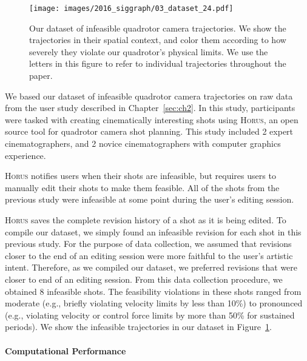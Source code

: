 \begin{figure}[th!]
\centering
\texttt{[image: images/2016\_siggraph/03\_dataset\_24.pdf]}
\caption{
Our dataset of infeasible quadrotor camera trajectories.
We show the trajectories in their spatial context, and color them according to how severely they violate our quadrotor's physical limits.
We use the letters in this figure to refer to individual trajectories throughout the paper.
}
\label{fig:ch3:dataset}
\end{figure}

We based our dataset of infeasible quadrotor camera trajectories on raw data from the user study described in Chapter~\ref{sec:ch2}.
In this study, participants were tasked with creating cinematically interesting shots using \textsc{Horus}, an open source tool for quadrotor camera shot planning.
This study included 2 expert cinematographers, and 2 novice cinematographers with computer graphics experience.

\textsc{Horus} notifies users when their shots are infeasible, but requires users to manually edit their shots to make them feasible.
All of the shots from the previous study were infeasible at some point during the user's editing session.

\textsc{Horus} saves the complete revision history of a shot as it is being edited.
To compile our dataset, we simply found an infeasible revision for each shot in this previous study.
For the purpose of data collection, we assumed that revisions closer to the end of an editing session were more faithful to the user's artistic intent.
Therefore, as we compiled our dataset, we preferred revisions that were closer to end of an editing session. 
From this data collection procedure, we obtained 8 infeasible shots.
The feasibility violations in these shots ranged from moderate (e.g., briefly violating velocity limits by less than 10\%) to pronounced (e.g., violating velocity or control force limits by more than 50\% for sustained periods). 
We show the infeasible trajectories in our dataset in Figure~\ref{fig:ch3:dataset}.

\paragraph{Computational Performance}


